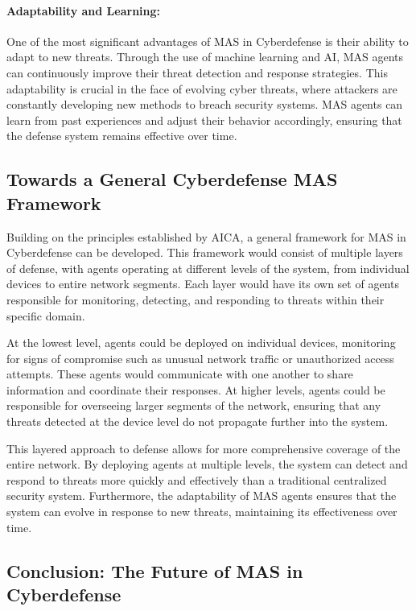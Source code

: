 \paragraph{Adaptability and Learning:}
One of the most significant advantages of MAS in Cyberdefense is their ability to adapt to new threats. Through the use of machine learning and AI, MAS agents can continuously improve their threat detection and response strategies. This adaptability is crucial in the face of evolving cyber threats, where attackers are constantly developing new methods to breach security systems. MAS agents can learn from past experiences and adjust their behavior accordingly, ensuring that the defense system remains effective over time.

\subsection{Towards a General Cyberdefense MAS Framework}

Building on the principles established by AICA, a general framework for MAS in Cyberdefense can be developed. This framework would consist of multiple layers of defense, with agents operating at different levels of the system, from individual devices to entire network segments. Each layer would have its own set of agents responsible for monitoring, detecting, and responding to threats within their specific domain.

At the lowest level, agents could be deployed on individual devices, monitoring for signs of compromise such as unusual network traffic or unauthorized access attempts. These agents would communicate with one another to share information and coordinate their responses. At higher levels, agents could be responsible for overseeing larger segments of the network, ensuring that any threats detected at the device level do not propagate further into the system.

This layered approach to defense allows for more comprehensive coverage of the entire network. By deploying agents at multiple levels, the system can detect and respond to threats more quickly and effectively than a traditional centralized security system. Furthermore, the adaptability of MAS agents ensures that the system can evolve in response to new threats, maintaining its effectiveness over time.

\subsection{Conclusion: The Future of MAS in Cyberdefense}

